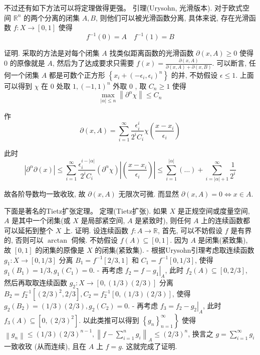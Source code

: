 \documentclass[options]{article}
\begin{document}
不过还有如下方法可以将定理做得更强。
引理(Urysohn, 光滑版本). 对于欧式空间 $\mathbb{R}^n$ 的两个分离的闭集 $A, B$, 则他们可以被光滑函数分离, 具体来说, 存在光滑函数 $f: X \rightarrow[0,1]$ 使得
\[
f^{-1}(0)=A \quad f^{-1}(1)=B
\]

证明. 采取的方法是对每个闭集 $A$ 找类似距离函数的光滑函数 $\partial(x, A) \geq 0$ 使得 0 的原像就是 $A$, 然后为了达成要求只需要 $f(x)=\frac{\partial(x, A)}{\partial(x, A)+\partial(x, B)}$. 可以断言, 任何一个闭集 $A$ 都是可数个正方形 $\left\{x_i+\left(-\epsilon_i, \epsilon_i\right)^n\right\}$ 的并, 不妨假设 $\epsilon \leq 1$. 上面可以得到 $\chi$ 在 0 处取 $1,(-1,1)^n$ 外取 0 , 取 $C_n \geq 1$ 使得
\[
\max _{|\alpha| \leq n}\left\|\partial^\alpha \chi\right\| \leq C_n
\]

作
\[
\partial(x, A)=\sum_{i=1}^{\infty} \frac{\epsilon_i^i}{2^i C_i} \chi\left(\frac{x-x_i}{\epsilon_i}\right)
\]

此时
\[
\left|\partial^\alpha \partial(x)\right| \leq \sum_{i=1}^{\infty} \frac{\epsilon_i^{i-|\alpha|}}{2^i C_i}\left(\partial^\alpha \chi\right)\left|\left(\frac{x-x_i}{\epsilon_i}\right)\right| \leq \sum_{i=1}^{|\alpha|}(\ldots)+\sum_{i=|\alpha|+1}^{\infty} \frac{1}{2^i}
\]

故各阶导数均一致收玫, 故 $\partial(x, A)$ 无限次可微. 而显然 $\partial(x, A)=0 \Longleftrightarrow x \in A$.

下面是著名的Tietz扩张定理。
定理(Tietz扩张). 如果 $X$ 是正规空间或度量空间, $A$ 是其中一个闭集(或 $X$ 是局部紧空间, $A$ 是紧致时), 则任何 $A$ 上的连续函数都可以延拓到整个 $X$ 上.
证明. 设连续函数 $f: A \rightarrow \mathbb{R}$, 首先, 可以不妨假设 $f$ 是有界的, 否则可以 $\arctan$ 伺候. 不妨假设 $f(A) \subseteq[0,1]$. 因为 $A$ 是闭集(紧致集), 故 $[0,1]$ 的闭集的原像是 $X$ 的闭集(紧致集).
- 根据Urysohn引理考虑取连续函数 $g_1: X \rightarrow[0,1 / 3]$ 分离 $B_1=f^{-1}[2 / 3,1]$ 和 $C_1=f^{-1}[0,1 / 3]$, 使得 $g_1\left(B_1\right)=1 / 3, g_1\left(C_1\right)=0$.
- 再考虑 $f_2=f-\left.g_1\right|_A$, 此时 $f_2(A) \subseteq[0,2 / 3]$, 然后再取取连续函数 $g_2: X \rightarrow[0,(1 / 3)(2 / 3)]$ 分离 $B_2=f_2^{-1}\left[(2 / 3)^2, 2 / 3\right], C_2=f_2^{-1}[0,(1 / 3)(2 / 3)]$, 使得 $g_2\left(B_2\right)=(1 / 3)(2 / 3), g_2\left(C_2\right)=0$.
- 再考虑 $f_3=f_2-\left.g_2\right|_A$, 此时 $f_3(A) \subseteq\left[0,(2 / 3)^2\right]$.
以此类推可以得到 $\left.\left\{g_n\right\}_{n=1}^{\infty}\right\}$ 使得 $\left\|g_n\right\| \leq(1 / 3)(2 / 3)^{n-1},\left\|f-\sum_{i=1}^n g_i\right\|_A \leq(2 / 3)^n$, 换言之 $g=\sum_{i=1}^{\infty} g_i$ 一致收玫 (从而连续), 且在 $A$ 上 $f=g$. 这就完成了证明.
\end{document}
